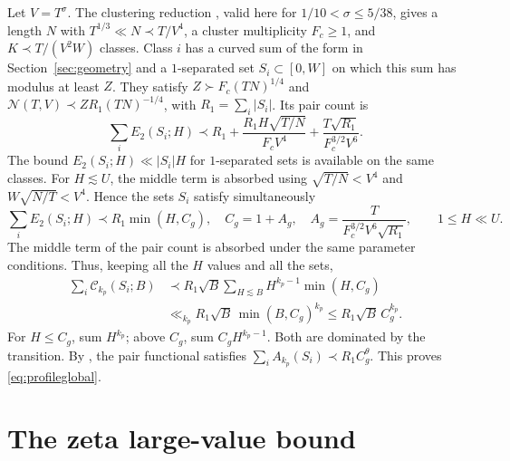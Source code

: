 \documentclass[11pt]{amsart}
\numberwithin{equation}{section}
\newcommand{\cN}{\mathcal N}
\begin{document}
Let $V=T^\sigma$. The clustering reduction
\cite[Proposition~\ref*{six-prop:clusterproof}]{Weighted}, valid here for
$1/10<\sigma\le5/38$, gives a length $N$ with
$T^{1/3}\ll N\prec T/V^4$, a cluster multiplicity $F_c\ge1$, and
$K\prec T/(V^2W)$ classes. Class $i$ has a curved sum of the form in
Section~\ref{sec:geometry} and a $1$-separated set $S_i\subset[0,W]$ on
which this sum has modulus at least $Z$. They satisfy
$Z\succ F_c(TN)^{1/4}$ and
$\cN(T,V)\prec ZR_1(TN)^{-1/4}$, with $R_1=\sum_i|S_i|$.
Its pair count is
\[
 \sum_iE_2(S_i;H)\prec R_1+
 \frac{R_1H\sqrt{T/N}}{F_cV^4}+
 \frac{T\sqrt{R_1}}{F_c^{3/2}V^6}.
\]
The bound $E_2(S_i;H)\ll|S_i|H$ for $1$-separated sets is available on
the same classes. For $H\lesssim U$,
the middle term is absorbed using
$\sqrt{T/N}<V^4$ and $W\sqrt{N/T}<V^4$.
Hence the sets $S_i$ satisfy
simultaneously
\begin{equation}\label{eq:pairbound}
\sum_i E_2(S_i;H)\prec R_1\min(H,C_g),\quad
 C_g=1+A_g,\quad A_g=\frac{T}{F_c^{3/2}V^6\sqrt{R_1}},
 \qquad 1\le H\ll U.
\end{equation}
The middle term of the pair count is absorbed under the same parameter
conditions. Thus, keeping all the $H$ values and all the sets,
\begin{equation}\label{eq:profileglobal}
\begin{split}
 \sum_i\mathcal C_{k_p}(S_i;B)
 &\prec R_1\sqrt B
          \sum_{H\lesssim B}H^{k_p-1}\min(H,C_g)\\
 &\ll_{k_p}R_1\sqrt B\,\min(B,C_g)^{k_p}
 \le R_1\sqrt B\,C_g^{k_p}.
\end{split}
\end{equation}
For \(H\le C_g\), sum \(H^{k_p}\); above \(C_g\), sum
\(C_gH^{k_p-1}\). Both are dominated by the transition.
By \cite[Lemma~\ref*{six-lem:weighted}]{Weighted}, the pair functional
satisfies \(\sum_i A_{k_p}(S_i)\prec R_1C_g^\theta\).
This proves \eqref{eq:profileglobal}.

\section{The zeta large-value bound}
\end{document}
